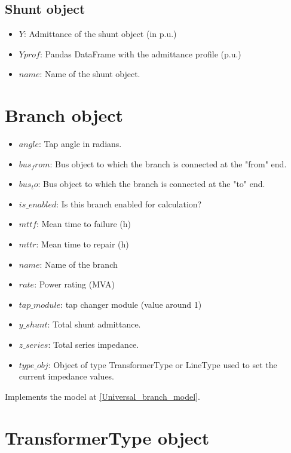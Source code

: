 \documentclass[11pt,fleqn]{book} %
\begin{document}
\subsection{Shunt object}

\begin{itemize}
	\item $Y$: Admittance of the shunt object (in p.u.)
	\item $Yprof$: Pandas DataFrame with the admittance profile (p.u.)
	\item $name$: Name of the shunt object.
\end{itemize}



\section{Branch object}


\begin{itemize}
	\item $angle$: Tap angle in radians.
	\item $bus_from$: Bus object to which the branch is connected at the "from" end.
	\item $bus_to$: Bus object to which the branch is connected at the "to" end.
	\item $is\_enabled$: Is this branch enabled for calculation?
	\item $mttf$: Mean time to failure (h)
	\item $mttr$: Mean time to repair (h)
	\item $name$: Name of the branch
	\item $rate$: Power rating (MVA)
	\item $tap\_module$: tap changer module (value around 1)
	\item $y\_shunt$: Total shunt admittance.
	\item $z\_series$: Total series impedance.
	\item $type\_obj$: Object of type TransformerType or LineType used to set the current impedance values. \newline
\end{itemize}

Implements the model at \ref{Universal_branch_model}.



\section{TransformerType object}
\end{document}
